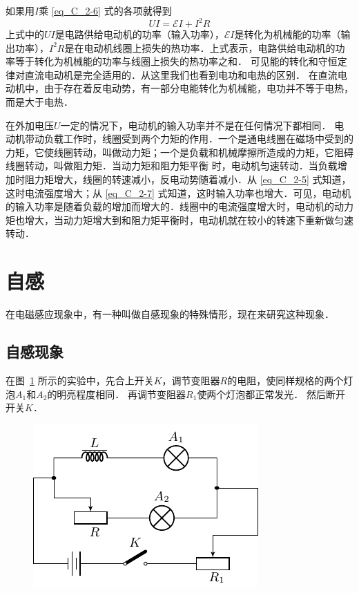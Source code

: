 如果用$I$乘 \eqref{eq_C_2-6} 式的各项就得到
\begin{equation}\label{eq_C_2-7}
    UI=\mathcal{E}I+I^2R
\end{equation}
上式中的$UI$是电路供给电动机的功率（输入功率），$\mathcal{E}I$是转化为机械能的功率（输出功率），$I^2R$是在电动机线圈上损失的热功率．上式表示，电路供给电动机的功率等于转化为机械能的功率与线圈上损失的热功率之和．
可见能的转化和守恒定律对直流电动机是完全适用的．从这里我们也看到电功和电热的区别．
在直流电动机中，由于存在着反电动势，有一部分电能转化为机械能，电功并不等于电热，而是大于电热．

在外加电压$U$一定的情况下，电动机的输入功率并不是在任何情况下都相同．
电动机带动负载工作时，线圈受到两个力矩的作用．一个是通电线圈在磁场中受到的力矩，它使线圈转动，叫做动力矩；一个是负载和机械摩擦所造成的力矩，它阻碍线圈转动，叫做阻力矩．当动力矩和阻力矩平衡
时，电动机匀速转动．当负载增加时阻力矩增大，线圈的转速减小，反电动势随着减小．从 \eqref{eq_C_2-5} 式知道，这时电流强度增大；从 \eqref{eq_C_2-7} 式知道，这时输入功率也增大．可见，电动机的输入功率是随着负载的增加而增大的．线圈中的电流强度增大时，电动机的动力矩也增大，当动力矩增大到和阻力矩平衡时，电动机就在较小的转速下重新做匀速转动．

\section{自感}
在电磁感应现象中，有一种叫做自感现象的特殊情形，现在来研究这种现象．

\subsection{自感现象}

在图~\ref{fig_C_2-25} 所示的实验中，先合上开关$K$，调节变阻器$R$的电阻，使同样规格的两个灯泡$A_1$和$A_2$的明亮程度相同．
再调节变阻器$R_1$使两个灯泡都正常发光．
然后断开开关$K$．
\begin{figure}[htbp]
    \centering
    \includegraphics{fig/C/2-25.pdf}
    \caption{}\label{fig_C_2-25}
\end{figure}

